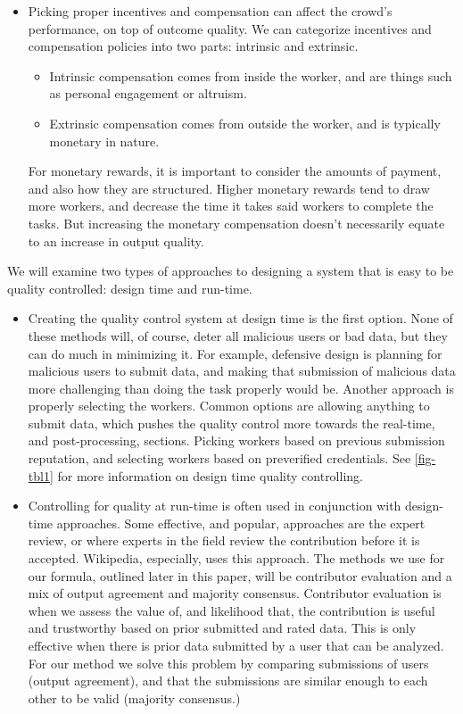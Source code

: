 \documentclass{sig-alternate-05-2015}
\begin{document}
\begin{itemize}
		\item Picking proper incentives and compensation can affect the crowd's performance, on top of outcome quality. \cite{scekic2012modeling}\cite{dow2012shepherding} We can categorize incentives and compensation policies into two parts: intrinsic and extrinsic.
		\begin{itemize}
			\item Intrinsic compensation comes from inside the worker, and are things such as personal engagement or altruism. 
			
			\item Extrinsic compensation comes from outside the worker, and is typically monetary in nature.
		\end{itemize}
		For monetary rewards, it is important to consider the amounts of payment, and also how they are structured. Higher monetary rewards tend to draw more workers, and decrease the time it takes said workers to complete the tasks. But increasing the monetary compensation doesn't necessarily equate to an increase in output quality. \cite{mason2010financial}
	\end{itemize}
	
	We will examine two types of approaches to designing a system that is easy to be quality controlled: design time and run-time. 
	
	\begin{itemize}
		\item Creating the quality control system at design time is the first option. None of these methods will, of course, deter all malicious users or bad data, but they can do much in minimizing it. For example, defensive design is planning for malicious users to submit data, and making that submission of malicious data more challenging than doing the task properly would be. Another approach is properly selecting the workers. Common options are allowing anything to submit data, which pushes the quality control more towards the real-time, and post-processing, sections. Picking workers based on previous submission reputation, and selecting workers based on preverified credentials. See \cref{fig-tbl1} for more information on design time quality controlling.
	
		\item Controlling for quality at run-time is often used in conjunction with design-time approaches. Some effective, and popular, approaches are the expert review, or where experts in the field review the contribution before it is accepted. Wikipedia, especially, uses this approach. The methods we use for our formula, outlined later in this paper, will be contributor evaluation and a mix of output agreement and majority consensus. Contributor evaluation is when we assess the value of, and likelihood that, the contribution is useful and trustworthy based on prior submitted and rated data. This is only effective when there is prior data submitted by a user that can be analyzed. For our method we solve this problem by comparing submissions of users (output agreement), and that the submissions are similar enough to each other to be valid (majority consensus.)
	\end{itemize}
	
\end{document}
